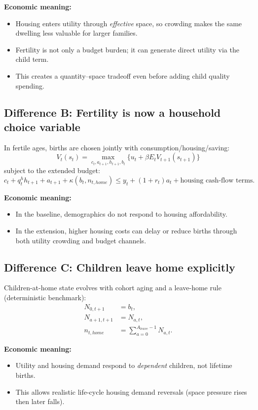 \documentclass[11pt]{article}
\begin{document}
\textbf{Economic meaning:}
\begin{itemize}
\item Housing enters utility through \emph{effective} space, so crowding makes the same dwelling less valuable for larger families.
\item Fertility is not only a budget burden; it can generate direct utility via the child term.
\item This creates a quantity--space tradeoff even before adding child quality spending.
\end{itemize}

\subsection*{Difference B: Fertility is now a household choice variable}
In fertile ages, births are chosen jointly with consumption/housing/saving:
\[
V_t(s_t)=\max_{c_t,a_{t+1},h_{t+1},b_t}\{u_t+\beta E_tV_{t+1}(s_{t+1})\}
\]
subject to the extended budget:
\[
 c_t + q_t^h h_{t+1} + a_{t+1} + \kappa(b_t,n_{t,home})
\le y_t + (1+r_t)a_t + \text{housing cash-flow terms}.
\]

\textbf{Economic meaning:}
\begin{itemize}
\item In the baseline, demographics do not respond to housing affordability.
\item In the extension, higher housing costs can delay or reduce births through both utility crowding and budget channels.
\end{itemize}

\subsection*{Difference C: Children leave home explicitly}
Children-at-home state evolves with cohort aging and a leave-home rule (deterministic benchmark):
\begin{align*}
N_{0,t+1} &= b_t, \\
N_{a+1,t+1} &= N_{a,t}, \\
n_{t,home} &= \sum_{a=0}^{A_{leave}-1}N_{a,t}.
\end{align*}

\textbf{Economic meaning:}
\begin{itemize}
\item Utility and housing demand respond to \emph{dependent} children, not lifetime births.
\item This allows realistic life-cycle housing demand reversals (space pressure rises then later falls).
\end{itemize}
\end{document}
